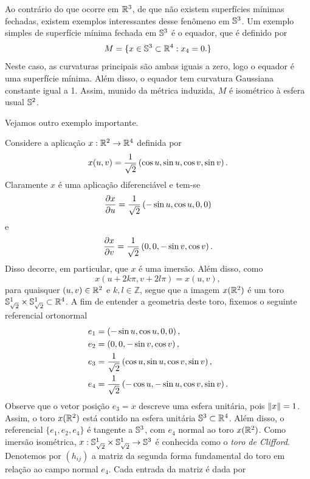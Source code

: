 Ao contrário do que ocorre em $\mathbb{R}^3$, de que não existem superfícies mínimas fechadas, existem exemplos interessantes desse fenômeno em $\mathbb{S}^3$. Um exemplo simples de superfície mínima fechada em $\mathbb{S}^3$ é o equador, que é definido por
\[ M = \{ x \in \mathbb{S}^3 \subset \mathbb{R}^4: x_4=0. \} \]
Neste caso, as curvaturas principais são ambas iguais a zero, logo o equador é uma superfície mínima. Além disso, o equador tem curvatura Gaussiana constante igual a 1. Assim, munido da métrica induzida, $M$ é isométrico à esfera usual $\mathbb{S}^2$.

Vejamos outro exemplo importante.

\begin{exemplo}
	Considere a aplicação $x: \mathbb{R}^2 \rightarrow \mathbb{R}^4$ definida por
	\begin{equation}\label{def:toro-de-clifford}
		x(u,v) = \frac{1}{\sqrt{2}} \left( \cos u, \sin u, \cos v, \sin v \right).
	\end{equation}
	Claramente $x$ é uma aplicação diferenciável e tem-se
	\[ \frac{\partial x}{\partial u} = \frac{1}{\sqrt{2}} \left( -\sin u, \cos u, 0, 0 \right) \]
	e
	\[ \frac{\partial x}{\partial v} = \frac{1}{\sqrt{2}} \left( 0,0, -\sin v, \cos v \right). \]
	Disso decorre, em particular, que $x$ é uma imersão. Além disso, como 
	\[x(u + 2k \pi, v + 2l \pi) = x(u,v), \] 
	para quaisquer $(u,v) \in \mathbb{R}^2$ e $k,l \in \mathbb{Z}$, segue que a imagem $x(\mathbb{R}^2)$ é um toro $\mathbb{S}_{\sqrt{2}}^1 \times \mathbb{S}_{\sqrt{2}}^1 \subset \mathbb{R}^4$. A fim de entender a geometria deste toro, fixemos o seguinte referencial ortonormal
	\begin{align*}
		e_1 &= \left( -\sin u, \cos u, 0, 0 \right),\\
		e_2 &= \left( 0, 0, -\sin v, \cos v \right),\\
		e_3 &= \frac{1}{\sqrt{2}} \left( \cos u, \sin u, \cos v, \sin v \right),\\
		e_4 &= \frac{1}{\sqrt{2}} \left( -\cos u, -\sin u, \cos v, \sin v \right).
	\end{align*}
	Observe que o vetor posição $e_3 = x$ descreve uma esfera unitária, pois $\left\| x \right\| = 1$. Assim, o toro $x(\mathbb{R}^2)$ está contido na esfera unitária $\mathbb{S}^3 \subset \mathbb{R}^4$. Além disso, o referencial $\{e_1,e_2,e_4\}$ é tangente a $\mathbb{S}^3$, com
	$e_4$ normal ao toro $x(\mathbb{R}^2)$. Como imersão isométrica, $x: \mathbb{S}_{\sqrt{2}}^1 \times \mathbb{S}_{\sqrt{2}}^1 \rightarrow \mathbb{S}^3$ é conhecida como o \emph{toro de Clifford}. Denotemos por $(h_{ij})$ a matriz da segunda forma fundamental do toro em relação ao campo normal $e_4$. Cada entrada da matriz é dada por

\end{exemplo}
